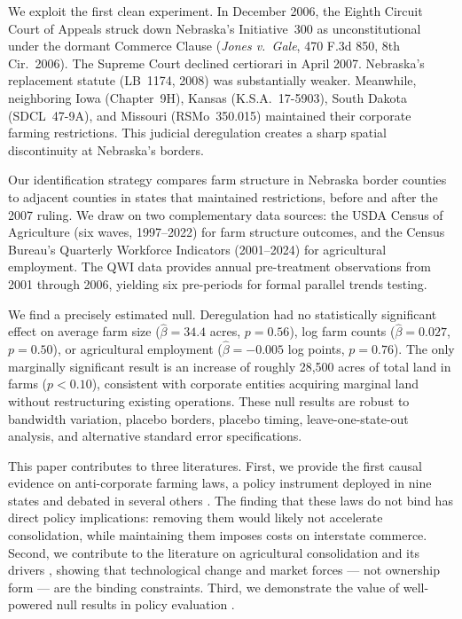 \documentclass[12pt]{article}
\begin{document}
We exploit the first clean experiment. In December 2006, the Eighth Circuit Court of Appeals struck down Nebraska's Initiative~300 as unconstitutional under the dormant Commerce Clause (\textit{Jones v.\ Gale}, 470 F.3d 850, 8th Cir.\ 2006). The Supreme Court declined certiorari in April 2007. Nebraska's replacement statute (LB~1174, 2008) was substantially weaker. Meanwhile, neighboring Iowa (Chapter~9H), Kansas (K.S.A.\ 17-5903), South Dakota (SDCL~47-9A), and Missouri (RSMo~350.015) maintained their corporate farming restrictions. This judicial deregulation creates a sharp spatial discontinuity at Nebraska's borders.

Our identification strategy compares farm structure in Nebraska border counties to adjacent counties in states that maintained restrictions, before and after the 2007 ruling. We draw on two complementary data sources: the USDA Census of Agriculture (six waves, 1997--2022) for farm structure outcomes, and the Census Bureau's Quarterly Workforce Indicators (2001--2024) for agricultural employment. The QWI data provides annual pre-treatment observations from 2001 through 2006, yielding six pre-periods for formal parallel trends testing.

We find a precisely estimated null. Deregulation had no statistically significant effect on average farm size ($\hat{\beta} = 34.4$ acres, $p = 0.56$), log farm counts ($\hat{\beta} = 0.027$, $p = 0.50$), or agricultural employment ($\hat{\beta} = -0.005$ log points, $p = 0.76$). The only marginally significant result is an increase of roughly 28,500 acres of total land in farms ($p < 0.10$), consistent with corporate entities acquiring marginal land without restructuring existing operations. These null results are robust to bandwidth variation, placebo borders, placebo timing, leave-one-state-out analysis, and alternative standard error specifications.

This paper contributes to three literatures. First, we provide the first causal evidence on anti-corporate farming laws, a policy instrument deployed in nine states and debated in several others \citep{Aiken2000}. The finding that these laws do not bind has direct policy implications: removing them would likely not accelerate consolidation, while maintaining them imposes costs on interstate commerce. Second, we contribute to the literature on agricultural consolidation and its drivers \citep{MacDonald2013, Key2009}, showing that technological change and market forces --- not ownership form --- are the binding constraints. Third, we demonstrate the value of well-powered null results in policy evaluation \citep{Abadie2020}.
\end{document}
